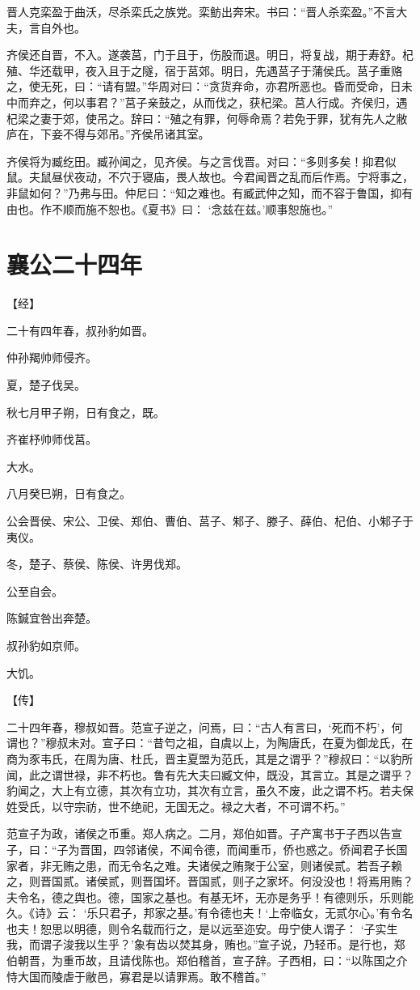 \documentclass[a4paper,12pt,UTF8,twoside]{ctexbook}
\begin{document}
晋人克栾盈于曲沃，尽杀栾氏之族党。栾鲂出奔宋。书曰：“晋人杀栾盈。”不言大夫，言自外也。

齐侯还自晋，不入。遂袭莒，门于且于，伤股而退。明日，将复战，期于寿舒。杞殖、华还载甲，夜入且于之隧，宿于莒郊。明日，先遇莒子于蒲侯氏。莒子重赂之，使无死，曰：“请有盟。”华周对曰：“贪货弃命，亦君所恶也。昏而受命，日未中而弃之，何以事君？”莒子亲鼓之，从而伐之，获杞梁。莒人行成。齐侯归，遇杞梁之妻于郊，使吊之。辞曰：“殖之有罪，何辱命焉？若免于罪，犹有先人之敝庐在，下妾不得与郊吊。”齐侯吊诸其室。

齐侯将为臧纥田。臧孙闻之，见齐侯。与之言伐晋。对曰：“多则多矣！抑君似鼠。夫鼠昼伏夜动，不穴于寝庙，畏人故也。今君闻晋之乱而后作焉。宁将事之，非鼠如何？”乃弗与田。仲尼曰：“知之难也。有臧武仲之知，而不容于鲁国，抑有由也。作不顺而施不恕也。《夏书》曰： ‘念兹在兹。’顺事恕施也。”

\chapter{襄公二十四年}


【经】

二十有四年春，叔孙豹如晋。

仲孙羯帅师侵齐。

夏，楚子伐吴。

秋七月甲子朔，日有食之，既。

齐崔杼帅师伐莒。

大水。

八月癸巳朔，日有食之。

公会晋侯、宋公、卫侯、郑伯、曹伯、莒子、邾子、滕子、薛伯、杞伯、小邾子于夷仪。

冬，楚子、蔡侯、陈侯、许男伐郑。

公至自会。

陈鍼宜咎出奔楚。

叔孙豹如京师。

大饥。

【传】

二十四年春，穆叔如晋。范宣子逆之，问焉，曰：“古人有言曰，‘死而不朽’，何谓也？”穆叔未对。宣子曰：“昔匄之祖，自虞以上，为陶唐氏，在夏为御龙氏，在商为豕韦氏，在周为唐、杜氏，晋主夏盟为范氏，其是之谓乎？”穆叔曰：“以豹所闻，此之谓世禄，非不朽也。鲁有先大夫曰臧文仲，既没，其言立。其是之谓乎？豹闻之，大上有立德，其次有立功，其次有立言，虽久不废，此之谓不朽。若夫保姓受氏，以守宗祊，世不绝祀，无国无之。禄之大者，不可谓不朽。”

范宣子为政，诸侯之币重。郑人病之。二月，郑伯如晋。子产寓书于子西以告宣子，曰：“子为晋国，四邻诸侯，不闻令德，而闻重币，侨也惑之。侨闻君子长国家者，非无贿之患，而无令名之难。夫诸侯之贿聚于公室，则诸侯贰。若吾子赖之，则晋国贰。诸侯贰，则晋国坏。晋国贰，则子之家坏。何没没也！将焉用贿？夫令名，德之舆也。德，国家之基也。有基无坏，无亦是务乎！有德则乐，乐则能久。《诗》云： ‘乐只君子，邦家之基。’有令德也夫！‘上帝临女，无贰尔心。’有令名也夫！恕思以明德，则令名载而行之，是以远至迩安。毋宁使人谓子： ‘子实生我，而谓子浚我以生乎？’象有齿以焚其身，贿也。”宣子说，乃轻币。是行也，郑伯朝晋，为重币故，且请伐陈也。郑伯稽首，宣子辞。子西相，曰：“以陈国之介恃大国而陵虐于敝邑，寡君是以请罪焉。敢不稽首。”
\end{document}
